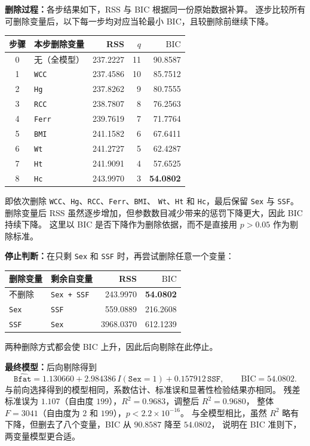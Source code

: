 \documentclass[12pt,a4paper]{article}
\begin{document}
\begin{answerbox}
\textbf{删除过程：}各步结果如下，RSS 与 BIC 根据同一份原始数据补算。
逐步比较所有可删除变量后，以下每一步均对应当轮最小 BIC，且较删除前继续下降。
\begin{center}
\small
\begin{tabular}{clrrr}
\toprule
步骤 & 本步删除变量 & RSS & $q$ & $\mathrm{BIC}$ \\
\midrule
0 & 无（全模型） & 237.2227 & 11 & 90.8587 \\
1 & \texttt{WCC} & 237.4586 & 10 & 85.7512 \\
2 & \texttt{Hg} & 237.8262 & 9 & 80.7555 \\
3 & \texttt{RCC} & 238.7807 & 8 & 76.2563 \\
4 & \texttt{Ferr} & 239.7619 & 7 & 71.7764 \\
5 & \texttt{BMI} & 241.1582 & 6 & 67.6411 \\
6 & \texttt{Wt} & 241.2727 & 5 & 62.4287 \\
7 & \texttt{Ht} & 241.9091 & 4 & 57.6525 \\
8 & \texttt{Hc} & 243.9970 & 3 & \textbf{54.0802} \\
\bottomrule
\end{tabular}
\end{center}
即依次删除 \texttt{WCC}、\texttt{Hg}、\texttt{RCC}、\texttt{Ferr}、\texttt{BMI}、
\texttt{Wt}、\texttt{Ht} 和 \texttt{Hc}，最后保留 \texttt{Sex} 与 \texttt{SSF}。
删除变量后 RSS 虽然逐步增加，但参数数目减少带来的惩罚下降更大，因此 BIC 持续下降。
这里以 BIC 是否下降作为删除依据，而不是直接用 $p>0.05$ 作为剔除标准。

\textbf{停止判断：}在只剩 \texttt{Sex} 和 \texttt{SSF} 时，再尝试删除任意一个变量：
\begin{center}
\small
\begin{tabular}{llrr}
\toprule
删除变量 & 剩余自变量 & RSS & $\mathrm{BIC}$ \\
\midrule
不删除 & \texttt{Sex + SSF} & 243.9970 & \textbf{54.0802} \\
\texttt{Sex} & \texttt{SSF} & 559.0889 & 216.2608 \\
\texttt{SSF} & \texttt{Sex} & 3968.0370 & 612.1239 \\
\bottomrule
\end{tabular}
\end{center}
两种删除方式都会使 BIC 上升，因此后向剔除在此停止。

\textbf{最终模型：}后向剔除得到
$$
\boxed{\widehat{\texttt{Bfat}}=1.130660+2.984386\,I(\texttt{Sex}=1)
+0.157912\,\texttt{SSF},\qquad \mathrm{BIC}=54.0802.}
$$
与前向选择得到的模型相同，系数估计、标准误和显著性检验结果亦相同。
残差标准误为 $1.107$（自由度 $199$），$R^2=0.9683$，调整后 $R^2=0.9680$，
整体 $F=3041$（自由度为 $2$ 和 $199$），$p<2.2\times10^{-16}$。
与全模型相比，虽然 $R^2$ 略有下降，但删去了八个变量，BIC 从 $90.8587$ 降至 $54.0802$，
说明在 BIC 准则下，两变量模型更合适。


\end{answerbox}
\end{document}

